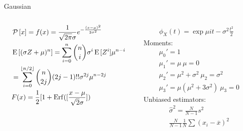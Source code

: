 \documentclass[asd-beamer.tex]{subfiles}%
\begin{document}
\begin{frame}{Gaussian}
	\begin{columns}[T]
		\begin{column}{0.5\textwidth}
			\begin{align*}
			&\operatorname{\mathcal{P}}{[x]}=f(x)=\frac{1}{\sqrt{2\pi}\sigma}e^{-\frac{(x-\mu)^2}{2\sigma^2}}\\
			&\operatorname{E}{[(\sigma Z+\mu)^n]}=\sum_{i=0}^n\binom{n}{i}\sigma^i\operatorname{E}{[Z^i]}\mu^{n-i}\\
			&=\sum_{i=0}^{\lfloor n/2\rfloor}\binom{n}{2j}(2j-1)!!\sigma^{2j}\mu^{n-2j}\\
			&F(x)=\frac{1}{2}[1+\operatorname{Erf}([\frac{x-\mu}{\sqrt{2}\sigma}])
			\end{align*}
		\end{column}
		\begin{column}{0.5\textwidth}
			\begin{align*}
			\phi_X(t)=\exp{\mu it-\sigma^2\frac{t^2}{2}}
			\end{align*}
			Moments:
			\begin{align*}
			&\mu_0'=1\\
			&\mu_1'=\mu\ \mu=0\\
			&\mu_2'=\mu^2+\sigma^2\ \mu_2=\sigma^2\\
			&\mu_3'=\mu(\mu^2+3\sigma^2)\ \mu_3=0
			\end{align*}
			Unbiased estimators:
			\begin{align*}
			&\hat{\sigma}^2=\frac{N}{N-1}s^2\\
			&\frac{N}{N-1}\frac{1}{N}\sum(x_i-\overline{x})^2
			\end{align*}
		\end{column}
	\end{columns}
\end{frame}
\end{document}
